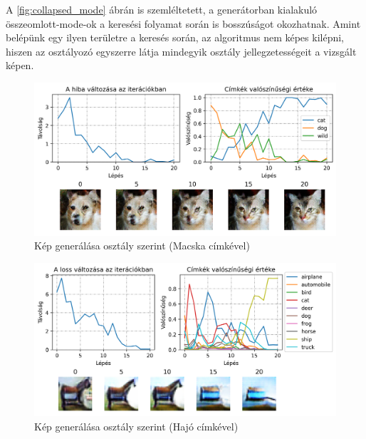 A \ref{fig:collapsed_mode} ábrán is szemléltetett, a generátorban kialakuló összeomlott-mode-ok a keresési folyamat során is bosszúságot okozhatnak. Amint belépünk egy ilyen területre a keresés során, az algoritmus nem képes kilépni, hiszen az osztályozó egyszerre látja mindegyik osztály jellegzetességeit a vizsgált képen.


\begin{figure}[h]
	\centering
	\includegraphics[width=15cm]{images/searching-cat.png}
	\caption{Kép generálása osztály szerint (Macska címkével)}
	\label{fig:searching}
\end{figure}

\begin{figure}[h]
	\centering
	\includegraphics[width=15cm]{images/searching-cifar_ship.png}
	\caption{Kép generálása osztály szerint (Hajó címkével)}
	\label{fig:searching_ship}
\end{figure}


